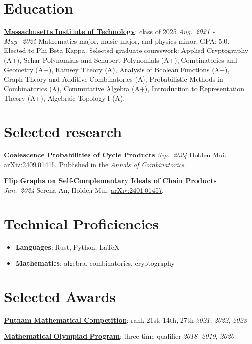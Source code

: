 \documentclass[12pt,a4paper,sans]{moderncv}
\newcommand{\datedline}[2]{#1 \hfill \emph{#2}}
\newcommand{\entry}[4]{%
  \datedline{\textbf{#1}: #2}{#3}\newline
  {\small #4}}
\newcommand{\paper}[3]{%
  \datedline{\textbf{#1}}{#2}\newline
  {\small #3}}
\newcommand{\shortentry}[3]{%
  \datedline{\textbf{#1}: #2}{#3}\par
  \addvspace{10pt}}
\begin{document}
\section{Education}
\entry
  {\href{https://www.mit.edu/}{Massachusetts Institute of Technology}}
  {class of 2025}
  {Aug.\ 2021 - May.\ 2025}
  {Mathematics major, music major, and physics minor. GPA: 5.0. Elected to Phi Beta Kappa.
   Selected graduate coursework: Applied Cryptography (A+), Schur Polynomials and Schubert
   Polynomials (A+), Combinatorics and Geometry (A+), Ramsey Theory (A), Analysis of Boolean
   Functions (A+), Graph Theory and Additive Combinatorics (A), Probabilistic Methods in
   Combinatorics (A), Commutative Algebra (A+), Introduction to Representation Theory (A+),
   Algebraic Topology I (A).}

\section{Selected research}
\paper
  {Coalescence Probabilities of Cycle Products}
  {Sep.\ 2024}
  {Holden Mui. \href{https://arxiv.org/abs/2409.01415}{arXiv:2409.01415}. Published in the
   \emph{Annals of Combinatorics}.}

\bigskip
\paper
  {Flip Graphs on Self-Complementary Ideals of Chain Products}
  {Jan.\ 2024}
  {Serena An, Holden Mui. \href{https://arxiv.org/abs/2401.01457}{arXiv:2401.01457}.}

\newpage

\section{Technical Proficiencies}
\begin{itemize}
    \item \textbf{Languages}: Rust, Python, LaTeX
    \item \textbf{Mathematics}: algebra, combinatorics, cryptography
\end{itemize}

\section{Selected Awards}
\shortentry
  {\href{https://www.maa.org/wp-content/uploads/2025/02/2021-Putnam-Announcement-of-Winners-1.pdf}{Putnam Mathematical Competition}}
  {rank 21st, 14th, 27th}
  {2021, 2022, 2023}
\shortentry
  {\href{https://maa.org/maa-invitational-competitions/}{Mathematical Olympiad Program}}
  {three-time qualifier}
  {2018, 2019, 2020}
\end{document}

